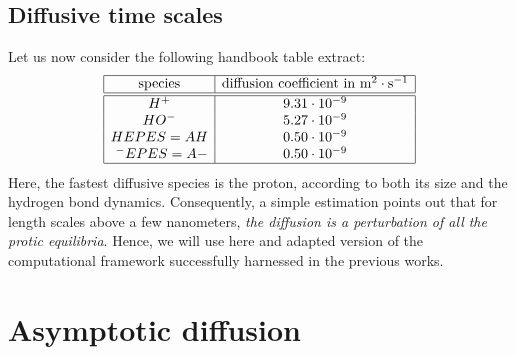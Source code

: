 \documentclass[aps,11pt]{revtex4}
\begin{document}
\subsection{Diffusive time scales}
Let us now consider the following handbook table extract:
\begin{equation}
\label{tab:diff}
\begin{array}{|c|c|}
\hline
\text{species} & \text{diffusion coefficient in } \text{m}^2\cdot\text{s}^{-1} \\
\hline
\hline
H^+     & 9.31 \cdot 10^{-9} \\
HO^-    & 5.27 \cdot 10^{-9} \\
 HEPES=AH  &   0.50 \cdot 10^{-9}\\
~^-EPES=A- &   0.50 \cdot 10^{-9}\\
\hline
\end{array}
\end{equation}
Here, the fastest diffusive species is the proton, according to both its size and the hydrogen bond dynamics.
Consequently, a simple estimation points out that for length scales above a few nanometers, \textit{the diffusion is a perturbation of all the protic equilibria}.
Hence, we will use here and adapted version of the computational framework successfully harnessed in the previous works.

\section{Asymptotic diffusion}
\end{document}
